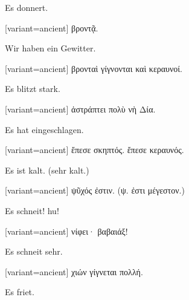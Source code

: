 Es donnert.

\switchcolumn

\begin{greek}[variant=ancient]%
βροντᾷ.

\end{greek}%
\switchcolumn*

Wir haben ein Gewitter.

\switchcolumn

\begin{greek}[variant=ancient]%
βρονταὶ γίγνονται καὶ κεραυνοί.

\end{greek}%
\switchcolumn*

Es blitzt stark.

\switchcolumn

\begin{greek}[variant=ancient]%
ἀστράπτει πολὺ νὴ Δία.

\end{greek}%
\switchcolumn*

Es hat eingeschlagen.

\switchcolumn

\begin{greek}[variant=ancient]%
ἔπεσε σκηπτός. ἔπεσε κεραυνός.

\end{greek}%
\switchcolumn*

Es ist kalt. (sehr kalt.)

\switchcolumn

\begin{greek}[variant=ancient]%
ψῦχός ἐστιν. (ψ. ἐστι μέγεστον.)

\end{greek}%
\switchcolumn*

Es schneit! hu!

\switchcolumn

\begin{greek}[variant=ancient]%
νίφει· βαβαιάξ!

\end{greek}%
\switchcolumn*

Es schneit sehr.

\switchcolumn

\begin{greek}[variant=ancient]%
χιών γίγνεται πολλή.

\end{greek}%
\switchcolumn*

Es friet.

\switchcolumn

